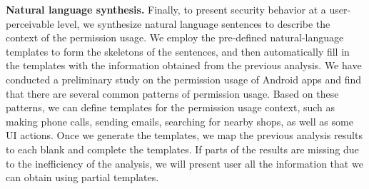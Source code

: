 
\textbf{Natural language synthesis.}
Finally, to present security behavior at a user-perceivable level, we synthesize natural language sentences to describe the context of the permission usage. 
We employ the pre-defined natural-language templates to form the skeletons of the sentences, and then automatically fill in the templates with the information obtained from the previous analysis.
We have conducted a preliminary study on the permission usage of Android apps and find that there are several common patterns of permission usage. 
Based on these patterns, we can define templates for the permission usage context, such as making phone calls, sending emails, searching for nearby shops, as well as some UI actions. Once we generate the templates, we map the previous analysis results to each blank and complete the templates. 
If parts of the results are missing due to the inefficiency of the analysis, we will present user all the information that we can obtain using partial templates.

